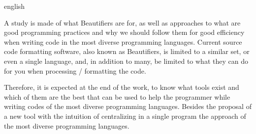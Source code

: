 \swapcontents
{
    \begin{otherlanguage*}{english}
    \begin{resumo}[Abstract]

        A study is made of what Beautifiers are for, as well as approaches to what are good
        programming practices and why we should follow them for good efficiency when writing code in
        the most diverse programming languages. Current source code formatting software, also known
        as Beautifiers, is limited to a similar set, or even a single language, and, in addition to
        many, be limited to what they can do for you when processing / formatting the code.

        Therefore, it is expected at the end of the work, to know what tools exist and which of them
        are the best that can be used to help the programmer while writing codes of the most diverse
        programming languages. Besides the proposal of a new tool with the intuition of centralizing
        in a single program the approach of the most diverse programming languages.


    \end{resumo}
    \end{otherlanguage*}
}
